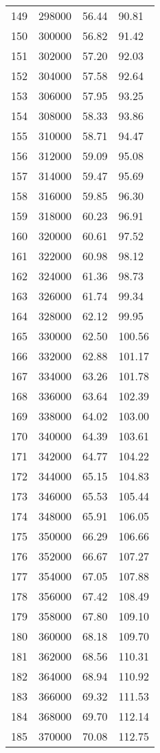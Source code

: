 \documentclass{article}
\begin{document}
\begin{longtable}{@{}l l l l}
149 & 298000 & 56.44 & 90.81\\
150 & 300000 & 56.82 & 91.42\\
151 & 302000 & 57.20 & 92.03\\
152 & 304000 & 57.58 & 92.64\\
153 & 306000 & 57.95 & 93.25\\
154 & 308000 & 58.33 & 93.86\\
155 & 310000 & 58.71 & 94.47\\
156 & 312000 & 59.09 & 95.08\\
157 & 314000 & 59.47 & 95.69\\
158 & 316000 & 59.85 & 96.30\\
159 & 318000 & 60.23 & 96.91\\
160 & 320000 & 60.61 & 97.52\\
161 & 322000 & 60.98 & 98.12\\
162 & 324000 & 61.36 & 98.73\\
163 & 326000 & 61.74 & 99.34\\
164 & 328000 & 62.12 & 99.95\\
165 & 330000 & 62.50 & 100.56\\
166 & 332000 & 62.88 & 101.17\\
167 & 334000 & 63.26 & 101.78\\
168 & 336000 & 63.64 & 102.39\\
169 & 338000 & 64.02 & 103.00\\
170 & 340000 & 64.39 & 103.61\\
171 & 342000 & 64.77 & 104.22\\
172 & 344000 & 65.15 & 104.83\\
173 & 346000 & 65.53 & 105.44\\
174 & 348000 & 65.91 & 106.05\\
175 & 350000 & 66.29 & 106.66\\
176 & 352000 & 66.67 & 107.27\\
177 & 354000 & 67.05 & 107.88\\
178 & 356000 & 67.42 & 108.49\\
179 & 358000 & 67.80 & 109.10\\
180 & 360000 & 68.18 & 109.70\\
181 & 362000 & 68.56 & 110.31\\
182 & 364000 & 68.94 & 110.92\\
183 & 366000 & 69.32 & 111.53\\
184 & 368000 & 69.70 & 112.14\\
185 & 370000 & 70.08 & 112.75\\

\end{longtable}
\end{document}
